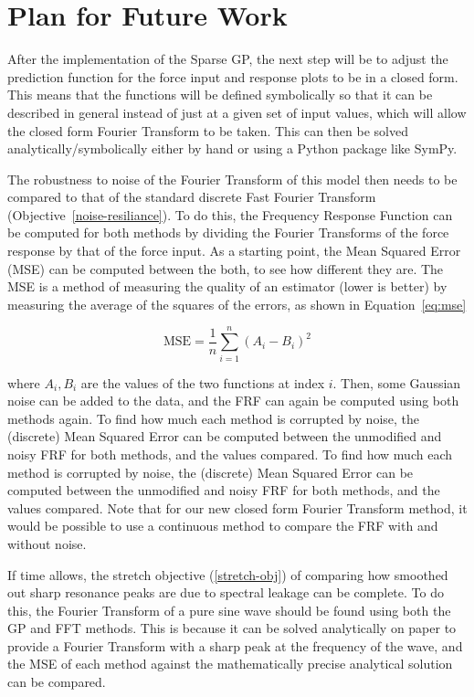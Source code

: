 \documentclass[12pt]{article}
\begin{document}
    \section{Plan for Future Work}
    After the implementation of the Sparse GP, the next step will be to adjust the prediction function for the force input and response plots to be in a closed form.
    This means that the functions will be defined symbolically so that it can be described in general instead of just at a given set of input values, which will allow the closed form Fourier Transform to be taken.
    This can then be solved analytically/symbolically either by hand or using a Python package like SymPy.

    The robustness to noise of the Fourier Transform of this model then needs to be compared to that of the standard discrete Fast Fourier Transform (Objective~\ref{noise-resiliance}).
    To do this, the Frequency Response Function can be computed for both methods by dividing the Fourier Transforms of the force response by that of the force input.
    As a starting point, the Mean Squared Error (MSE) can be computed between the both, to see how different they are.
    The MSE is a method of measuring the quality of an estimator (lower is better) by measuring the average of the squares of the errors, as shown in Equation~\ref{eq:mse}

    \begin{equation}
        \text{MSE} = \frac{1}{n} \sum_{i=1}^{n} (A_i - B_i)^2
        \label{eq:mse}
    \end{equation}


    where $A_i, B_i$ are the values of the two functions at index $i$.
    Then, some Gaussian noise can be added to the data, and the FRF can again be computed using both methods again.
    To find how much each method is corrupted by noise, the (discrete) Mean Squared Error can be computed between the unmodified and noisy FRF for both methods, and the values compared.
    To find how much each method is corrupted by noise, the (discrete) Mean Squared Error can be computed between the unmodified and noisy FRF for both methods, and the values compared.
    Note that for our new closed form Fourier Transform method, it would be possible to use a continuous method to compare the FRF with and without noise.

    If time allows, the stretch objective (\ref{stretch-obj}) of comparing how smoothed out sharp resonance peaks are due to spectral leakage can be complete.
    To do this, the Fourier Transform of a pure sine wave should be found using both the GP and FFT methods.
    This is because it can be solved analytically on paper to provide a Fourier Transform with a sharp peak at the frequency of the wave, and the MSE of each method against the mathematically precise analytical solution can be compared.
\end{document}
